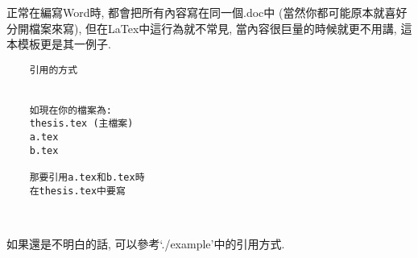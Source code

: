 
正常在編寫Word時, 都會把所有內容寫在同一個.doc中 (當然你都可能原本就喜好分開檔案來寫), 但在LaTex中這行為就不常見, 當內容很巨量的時候就更不用講, 這本模板更是其一例子.\\

  \begin{DescriptionFrame}
  \begin{verbatim}
    引用的方式
    

    如現在你的檔案為:
    thesis.tex (主檔案)
    a.tex
    b.tex

    那要引用a.tex和b.tex時
    在thesis.tex中要寫
    
    
  \end{verbatim}
  \end{DescriptionFrame}

如果還是不明白的話, 可以參考`./example'中的引用方式.

